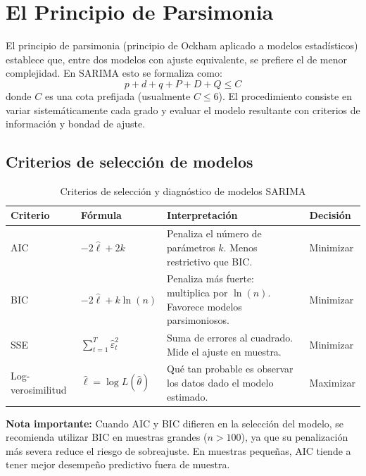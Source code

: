 \documentclass[12pt, a4paper]{article}
\begin{document}
\section{El Principio de Parsimonia}

El principio de parsimonia (principio de Ockham aplicado a modelos estadísticos)
establece que, entre dos modelos con ajuste equivalente, se prefiere el de menor
complejidad. En SARIMA esto se formaliza como:
\[
  p + d + q + P + D + Q \leq C
\]
donde $C$ es una cota prefijada (usualmente $C \leq 6$). El procedimiento
consiste en variar sistemáticamente cada grado y evaluar el modelo resultante
con criterios de información y bondad de ajuste.

\subsection{Criterios de selección de modelos}

\begin{table}[H]
  \centering
  \caption{Criterios de selección y diagnóstico de modelos SARIMA}
  \label{tab:criterios}
  \begin{tabular}{llp{5cm}l}
    \toprule
    \textbf{Criterio} & \textbf{Fórmula} & \textbf{Interpretación} & \textbf{Decisión} \\
    \midrule
    AIC & $-2\hat{\ell} + 2k$ & Penaliza el número de parámetros $k$. Menos restrictivo que BIC. & Minimizar \\
    BIC & $-2\hat{\ell} + k\ln(n)$ & Penaliza más fuerte: multiplica por $\ln(n)$. Favorece modelos parsimoniosos. & Minimizar \\
    SSE & $\sum_{t=1}^{T}\hat{\varepsilon}_t^2$ & Suma de errores al cuadrado. Mide el ajuste en muestra. & Minimizar \\
    Log-verosimilitud & $\hat{\ell} = \log L(\hat{\theta})$ & Qué tan probable es observar los datos dado el modelo estimado. & Maximizar \\
    \bottomrule
  \end{tabular}
\end{table}

\noindent\textbf{Nota importante:} Cuando AIC y BIC difieren en la selección del
modelo, se recomienda utilizar BIC en muestras grandes ($n > 100$), ya que su
penalización más severa reduce el riesgo de sobreajuste. En muestras pequeñas,
AIC tiende a tener mejor desempeño predictivo fuera de muestra.
\end{document}
